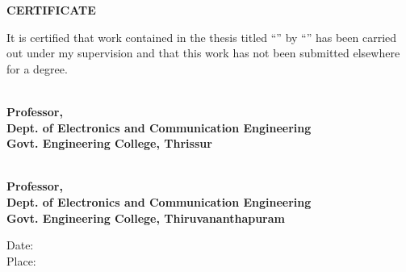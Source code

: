 
\begin{center}
{\bf\large CERTIFICATE }\\
\par\vspace{5mm}
\end{center}
\noindent It is certified that work contained in the thesis titled
``\textbf\thetitle{}'' by ``\thescholar'' has been
carried out under my supervision and that this work has not been submitted
elsewhere for a degree.
\vspace{20mm}

\begin{flushleft}
\textbf{\thesupervisor\\
Professor,\\Dept. of Electronics and Communication Engineering\\ Govt.
Engineering College, Thrissur}
\vspace{1cm}

\textbf{\thecosupervisor\\
Professor,\\Dept. of Electronics and Communication Engineering\\ Govt.
Engineering College, Thiruvananthapuram}

\end{flushleft}
\vspace{5mm}


\vspace{15mm}

\begin{flushleft}

Date:\\
Place:
\end{flushleft}